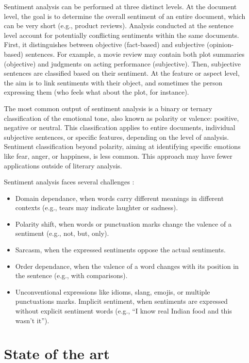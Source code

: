 \documentclass{article}
\begin{document}
Sentiment analysis can be performed at three distinct levels. At the document level, the goal is to determine the overall sentiment of an entire document, which can be very short (e.g., product reviews). Analysis conducted at the sentence level account for potentially conflicting sentiments within the same documents. First, it distinguishes between objective (fact-based) and subjective (opinion-based) sentences. For example, a movie review may contain both plot summaries (objective) and judgments on acting performance (subjective). Then, subjective sentences are classified based on their sentiment. At the feature or aspect level, the aim is to link sentiments with their object, and sometimes the person expressing them (who feels what about the plot, for instance).

The most common output of sentiment analysis is a binary or ternary classification of the emotional tone, also known as polarity or valence: positive, negative or neutral. This classification applies to entire documents, individual subjective sentences, or specific features, depending on the level of analysis. Sentiment classification beyond polarity, aiming at identifying specific emotions like fear, anger, or happiness, is less common. This approach may have fewer applications outside of literary analysis.

Sentiment analysis faces several challenges \citep{kumar_comprehensive_2023}:
\begin{itemize}
    \item Domain dependance, when words carry different meanings in different contexts (e.g., tears may indicate laughter or sadness).
    \item Polarity shift, when words or punctuation marks change the valence of a sentiment (e.g., not, but, only).
    \item Sarcasm, when the expressed sentiments oppose the actual sentiments.
    \item Order dependance, when the valence of a word changes with its position in the sentence (e.g., with comparisons).
    \item Unconventional expressions like idioms, slang, emojis, or multiple punctuations marks.
Implicit sentiment, when sentiments are expressed without explicit sentiment words (e.g., “I know real Indian food and this wasn’t it”).
\end{itemize}


\section{State of the art}
\end{document}
